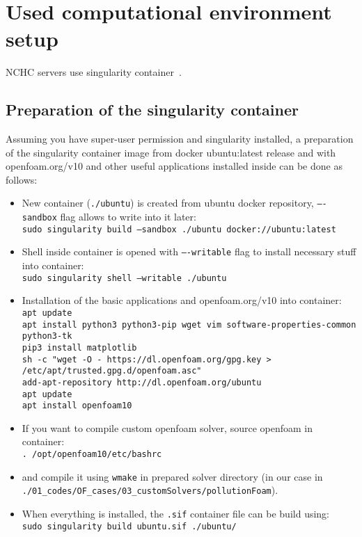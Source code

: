 \cleardoublepage

\section{Used computational environment setup}
\label{sec:env}

NCHC servers use singularity container~\cite{singularity}.

\subsection{Preparation of the singularity container}
\label{subsec:prepCont}

Assuming you have super-user permission and singularity installed, a preparation of the singularity container image from docker ubuntu:latest release and with openfoam.org/v10 and other useful applications installed inside can be done as follows:
\begin{itemize}
    \item New container (\texttt{./ubuntu}) is created from ubuntu docker repository, \texttt{----sandbox} flag allows to write into it later:\\[0.2cm] 
    \texttt{sudo singularity build --sandbox ./ubuntu docker://ubuntu:latest}
    \item Shell inside container is opened with \texttt{----writable} flag to install necessary stuff into container:\\[0.2cm] 
    \texttt{sudo singularity shell --writable ./ubuntu}
    \item Installation of the basic applications and openfoam.org/v10 into container:\\[0.2cm] 
    \texttt{apt update}\\
    \texttt{apt install python3 python3-pip wget vim software-properties-common \\ \indent\quad\quad python3-tk}\\
    \texttt{pip3 install matplotlib}\\
    \texttt{sh -c "wget -O - https://dl.openfoam.org/gpg.key >} \\ \indent\quad\quad\texttt{/etc/apt/trusted.gpg.d/openfoam.asc"}\\
    \texttt{add-apt-repository http://dl.openfoam.org/ubuntu}\\
    \texttt{apt update}\\
    \texttt{apt install openfoam10}
    \item If you want to compile custom openfoam solver, source openfoam in container:\\[0.2cm] 
    \texttt{. /opt/openfoam10/etc/bashrc}
    \item and compile it using \texttt{wmake} in prepared solver directory (in our case in\\ \texttt{./01\_codes/OF\_cases/03\_customSolvers/pollutionFoam}).
    \item When everything is installed, the \texttt{.sif} container file can be build using:\\[0.2cm] 
    \texttt{sudo singularity build ubuntu.sif ./ubuntu/}
\end{itemize}

